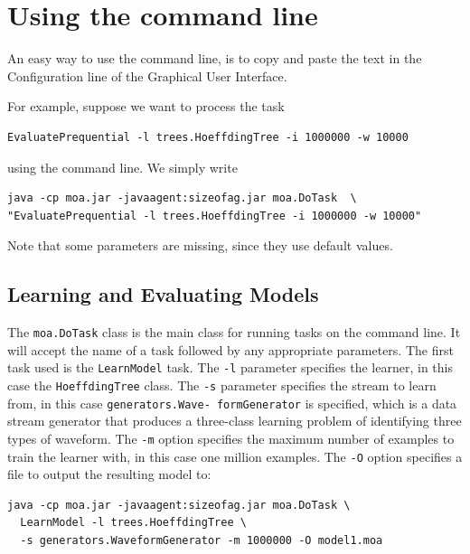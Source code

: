 \documentclass[a4paper,12pt]{article}
\begin{document}


\section{Using the command line}

An easy way to use the command line, is to copy and paste the text in the Configuration line of the Graphical User Interface.%


For example, suppose we want to process the task 
\begin{verbatim}EvaluatePrequential -l trees.HoeffdingTree -i 1000000 -w 10000\end{verbatim} 
using the command line. We simply write 
\begin{verbatim}
java -cp moa.jar -javaagent:sizeofag.jar moa.DoTask  \
"EvaluatePrequential -l trees.HoeffdingTree -i 1000000 -w 10000"
\end{verbatim}

Note that some parameters are missing, since they use default values.


\subsection{Learning and Evaluating Models}

The \verb+moa.DoTask+ class is the main class for running tasks on the command line. It will accept the name of a task followed by any appropriate parameters. The first task used is the \verb+LearnModel+ task. The \verb+-l+ parameter specifies the learner, in this case the \verb+HoeffdingTree+ class. The \verb+-s+ parameter specifies the stream to learn from, in this case {\tt generators.Wave- formGenerator} is specified, which is a data stream generator that produces a three-class learning problem of identifying three types of waveform. The \verb+-m+ option specifies the maximum number of examples to train the learner with, in this case one million examples. The \verb+-O+ option specifies a file to output the resulting model to:

\begin{verbatim}
java -cp moa.jar -javaagent:sizeofag.jar moa.DoTask \
  LearnModel -l trees.HoeffdingTree \
  -s generators.WaveformGenerator -m 1000000 -O model1.moa
\end{verbatim}
\end{document}
